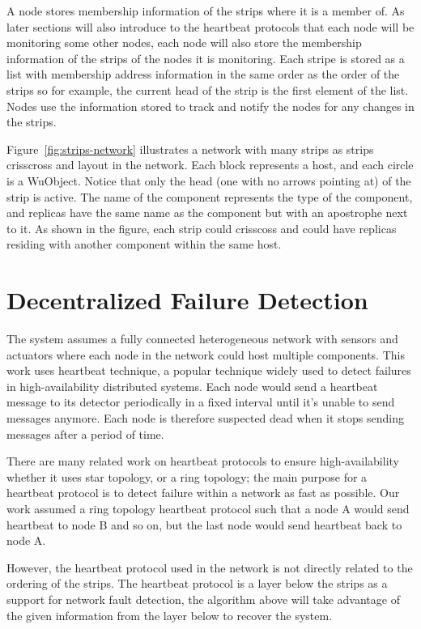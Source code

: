 A node stores membership information of the strips where it is a member of. As
later sections will also introduce to the heartbeat protocols that each node will
be monitoring some other nodes, each node will also store the membership
information of the strips of the nodes it is monitoring. Each stripe is stored
as a list with membership address information in the same order as the order of the
strips so for example, the current head of the strip is the first element of
the list. Nodes use the information stored to track and notify the nodes for
any changes in the strips.

Figure~\ref{fig:strips-network} illustrates a network with many strips as
strips crisscross and layout in the network. Each block represents a host, and
each circle is a WuObject. Notice that only the head (one with no arrows
pointing at) of the strip is active. The name of the component represents the
type of the component, and replicas have the same name as the component but
with an apostrophe next to it. As shown in the figure, each strip could
crisscoss and could have replicas residing with another component within the
same host.

\section{Decentralized Failure Detection}
\label{s:dfd}

The system assumes a fully connected heterogeneous network with sensors and
actuators where each node in the network could host multiple components. This
work uses heartbeat technique, a popular technique widely used to detect
failures in high-availability distributed systems. Each node would send
a heartbeat message to its detector periodically in a fixed interval
until it's unable to send messages anymore. Each node is therefore suspected
dead when it stops sending messages after a period of time.

There are many related work on heartbeat protocols to ensure high-availability
whether it uses star topology, or a ring topology; the main purpose for
a heartbeat protocol is to detect failure within a network as fast as possible.
Our work assumed a ring topology heartbeat protocol such that a node A would
send heartbeat to node B and so on, but the last node would send heartbeat back
to node A.

However, the heartbeat protocol used in the network is not directly related to
the ordering of the strips. The heartbeat protocol is a layer below the strips
as a support for network fault detection, the algorithm above will take
advantage of the given information from the layer below to recover the system.

